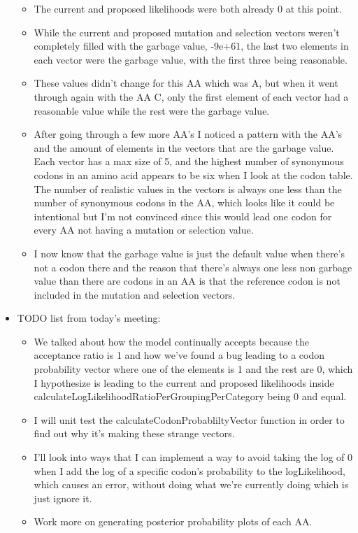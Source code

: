 \documentclass[11pt]{labbook}
\begin{document}
\begin{itemize}
\begin{itemize}
                \item The current and proposed likelihoods were both already 0 at this point.
                \item While the current and proposed mutation and selection vectors weren't completely filled with the garbage value, -9e+61, the last two elements in each vector were the garbage value, with the first three being reasonable.
                \item These values didn't change for this AA which was A, but when it went through again with the AA C, only the first element of each vector had a reasonable value while the rest were the garbage value.
                \item After going through a few more AA's I noticed a pattern with the AA's and the amount of elements in the vectors that are the garbage value. Each vector has a max size of 5, and the highest number of synonymous codons in an amino acid appears to be six when I look at the codon table. The number of realistic values in the vectors is always one less than the number of synonymous codons in the AA, which looks like it could be intentional but I'm not convinced since this would lead one codon for every AA not having a mutation or selection value.
                \item I now know that the garbage value is just the default value when there's not a codon there and the reason that there's always one less non garbage value than there are codons in an AA is that the reference codon is not included in the mutation and selection vectors. 
            \end{itemize}
        \item TODO list from today's meeting:
            \begin{itemize}
                \item We talked about how the model continually accepts because the acceptance ratio is 1 and how we've found a bug leading to a codon probability vector where one of the elements is 1 and the rest are 0, which I hypothesize is leading to the current and proposed likelihoods inside calculateLogLikelihoodRatioPerGroupingPerCategory being 0 and equal. 
                \item I will unit test the calculateCodonProbabliltyVector function in order to find out why it's making these strange vectors. 
                \item I'll look into ways that I can implement a way to avoid taking the log of 0 when I add the log of a specific codon's probability to the logLikelihood, which causes an error, without doing what we're currently doing which is just ignore it.
                \item Work more on generating posterior probability plots of each AA.
            \end{itemize}
    \end{itemize}
\end{document}

